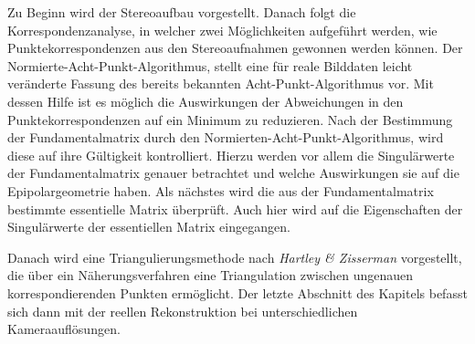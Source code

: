 
Zu Beginn wird der Stereoaufbau vorgestellt. Danach folgt die Korrespondenzanalyse, in welcher zwei Möglichkeiten aufgeführt werden, wie Punktekorrespondenzen aus den Stereoaufnahmen gewonnen werden können. Der Normierte-Acht-Punkt-Algorithmus, stellt eine für reale Bilddaten leicht veränderte Fassung des bereits bekannten Acht-Punkt-Algorithmus vor. Mit dessen Hilfe ist es möglich die Auswirkungen der Abweichungen in den Punktekorrespondenzen auf ein Minimum zu reduzieren. Nach der Bestimmung der Fundamentalmatrix durch den Normierten-Acht-Punkt-Algorithmus, wird diese auf ihre Gültigkeit kontrolliert. Hierzu werden vor allem die Singulärwerte der Fundamentalmatrix genauer betrachtet und welche Auswirkungen sie auf die Epipolargeometrie haben. Als nächstes wird die aus der Fundamentalmatrix bestimmte essentielle Matrix überprüft. Auch hier wird auf die Eigenschaften der Singulärwerte der essentiellen Matrix eingegangen.
\pagebreak

Danach wird eine Triangulierungsmethode nach \textit{Hartley \& Zisserman} \cite{HZ} vorgestellt, die über ein Näherungsverfahren eine Triangulation zwischen ungenauen korrespondierenden Punkten ermöglicht. Der letzte Abschnitt des Kapitels befasst sich dann mit der reellen Rekonstruktion bei unterschiedlichen Kameraauflösungen. \\



%
%
%
%
%
%


